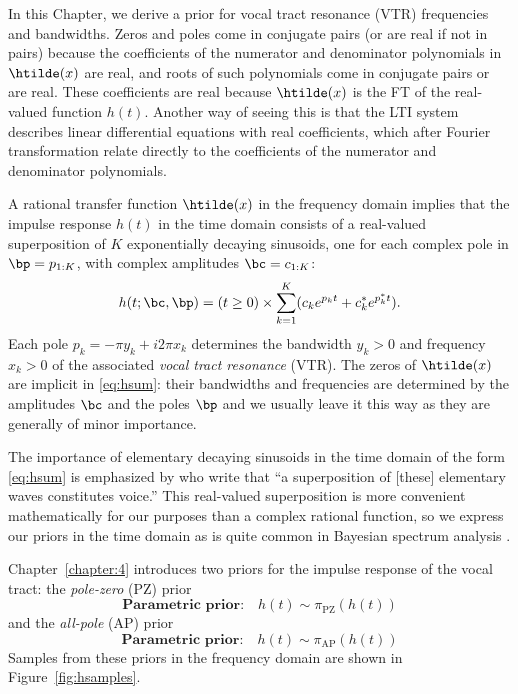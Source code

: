 \begin{chaptersections}{%
In this Chapter, we derive a prior for vocal tract resonance (VTR) frequencies and bandwidths.
}
Zeros and poles come in conjugate pairs (or are real if not in pairs) because the coefficients of the numerator and denominator polynomials in $\htilde(x)$ are real, and roots of such polynomials come in conjugate pairs or are real.
These coefficients are real because $\htilde(x)$ is the FT of the real-valued function $h(t)$.
Another way of seeing this is that the LTI system describes linear differential equations with real coefficients, which after Fourier transformation relate directly to the coefficients of the numerator and denominator polynomials.

A rational transfer function $\htilde(x)$ in the frequency domain implies that the impulse response $h(t)$ in the time domain consists of a real-valued superposition of $K$ exponentially decaying sinusoids, one for each complex pole in $\bp = p_{1:K}$, with complex amplitudes $\bc = c_{1:K}$:
\begin{equation}
	h(t; \bc, \bp) = (t \geq 0) \times \sum_{k=1}^K (c_k e^{p_k t} + c_k^* e^{p_k^* t}). \label{eq:hsum}
\end{equation}
Each pole $p_k = -\pi y_k + i 2\pi x_k$ determines the bandwidth $y_k > 0$ and frequency $x_k > 0$ of the associated \emph{vocal tract resonance} (VTR).
The zeros of $\htilde(x)$ are implicit in \eqref{eq:hsum}: their bandwidths and frequencies are determined by the amplitudes $\bc$ and the poles $\bp$ and we usually leave it this way as they are generally of minor importance.

The importance of elementary decaying sinusoids in the time domain of the form \eqref{eq:hsum} is emphasized by \cite{Chen2019} who write that ``a superposition of [these] elementary waves constitutes voice.'' %
This real-valued superposition is more convenient mathematically for our purposes than a complex rational function, so we express our priors in the time domain as is quite common in Bayesian spectrum analysis \citep{Turner2014}.

Chapter~\ref{chapter:4} introduces two priors for the impulse response of the vocal tract: the \emph{pole-zero} (PZ) prior
\begin{equation}
	\hyperref[chapter:4]{\boxed{\textbf{Parametric prior:} \quad h(t) \sim \pi_\text{PZ}(h(t))}}
\end{equation}
and the \emph{all-pole} (AP) prior
\begin{equation}
	\hyperref[chapter:4]{\boxed{\textbf{Parametric prior:} \quad h(t) \sim \pi_\text{AP}(h(t))}}
\end{equation}
Samples from these priors in the frequency domain are shown in Figure~\ref{fig:hsamples}.


\end{chaptersections}
